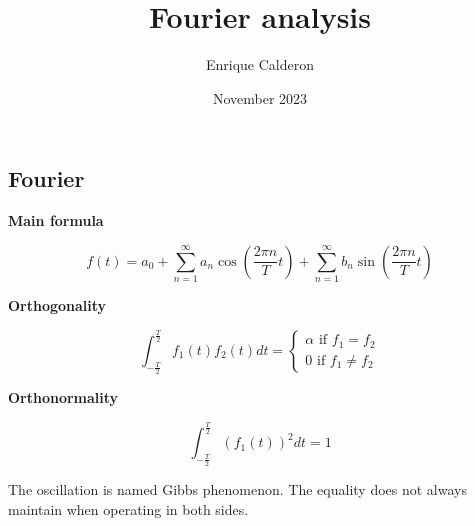 \documentclass[letterpaper]{article}
\title{Fourier analysis}
\author{Enrique Calderon}
\date{November 2023}
\newcommand{\divline}{\noindent\makebox[\linewidth]{\rule{\textwidth}{0.4pt}}}
\begin{document}
        \maketitle

        \divline

	\begin{multicols}{2}
		\section{Fourier}

                \textbf{Main formula}
  
                \[f(t) = a_{0} + \sum_{n = 1}^{\infty} a_{n} \cos{( \frac{2 \pi n}{T} t )} + \sum_{n = 1}^{\infty} b_{n} \sin{( \frac{2 \pi n}{T} t )} \]

                \textbf{Orthogonality}

                \[ \int_{-\frac{T}{2}}^{\frac{T}{2}} f_{1}(t) f_{2}(t) dt = 
                    \begin{cases} 
					\alpha \text{ if } f_{1} = f_{2} \\
					0 \text{ if } f_{1} \neq f_{2}
				\end{cases}
                \]

                \textbf{Orthonormality}

                \[ \int_{-\frac{T}{2}}^{\frac{T}{2}} (f_{1}(t))^2 dt = 1 \]

                The oscillation is named Gibbs phenomenon.
                The equality does not always maintain when operating in both sides.
                
	\end{multicols}
 
	\divline
\end{document}
